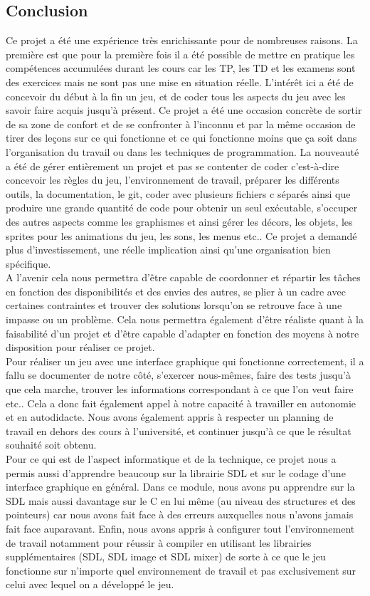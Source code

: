 \documentclass[a4paper,11pt]{article}
\begin{document}
\subsection{Conclusion}
Ce projet a été une expérience très enrichissante pour de nombreuses raisons. La première est que pour la première fois il a été 
possible de mettre en pratique les compétences accumulées durant les cours car les TP, les TD et les examens sont des exercices
mais ne sont pas une mise en situation réelle. L'intérêt ici a été de concevoir du début à la fin un jeu, et de coder tous les aspects
du jeu avec les savoir faire acquis jusqu'à présent. Ce projet a été une occasion concrète de sortir de sa zone de confort et de se confronter
à l'inconnu et par la même occasion de tirer des leçons sur ce qui fonctionne et ce qui fonctionne moins que ça soit dans l'organisation
du travail ou dans les techniques de programmation. La nouveauté a été de gérer entièrement un projet et pas se contenter de coder c'est-à-dire
concevoir les règles du jeu, l'environnement de travail, préparer les différents outils, la documentation, le git, coder avec plusieurs 
fichiers c séparés ainsi que produire une grande quantité de code pour obtenir un seul exécutable, s'occuper des autres aspects comme les graphismes
et ainsi gérer les décors, les objets, les sprites pour les animations du jeu, les sons, les menus etc.. Ce projet a demandé plus d'investissement, une réelle implication
ainsi qu'une organisation bien spécifique.\\
A l'avenir cela nous permettra d'être capable de coordonner et répartir les tâches en fonction des disponibilités et des envies des autres,
se plier à un cadre avec certaines contraintes et trouver des solutions lorsqu'on se retrouve face à une impasse ou un problème. Cela nous
permettra également d'être réaliste quant à la faisabilité d'un projet et d'être capable d'adapter en fonction des moyens à notre disposition
pour réaliser ce projet.\\
Pour réaliser un jeu avec une interface graphique qui fonctionne correctement, il a fallu se documenter 
de notre côté, s'exercer nous-mêmes, faire des tests jusqu'à que cela marche, trouver les informations correspondant à ce que l'on veut faire etc..
Cela a donc fait également appel à notre capacité à travailler en autonomie et en autodidacte. Nous avons également appris à respecter un planning de travail en dehors des cours
à l'université, et continuer jusqu'à ce que le résultat souhaité soit obtenu.\\
Pour ce qui est de l'aspect informatique et de la technique, ce projet nous a permis aussi d'apprendre beaucoup sur la librairie SDL et sur le
codage d'une interface graphique en général.
Dans ce module, nous avons pu apprendre sur la SDL mais aussi davantage sur le C en lui même (au niveau des structures et des pointeurs)
car nous avons fait face à des erreurs auxquelles nous n'avons jamais fait face auparavant. 
Enfin, nous avons appris à configurer tout l'environnement de travail notamment pour réussir à compiler en utilisant les librairies supplémentaires
(SDL, SDL image et SDL mixer) de sorte à ce que le jeu fonctionne sur n'importe quel environnement de travail et pas exclusivement sur celui avec lequel
on a développé le jeu.\\
\newpage
\end{document}
